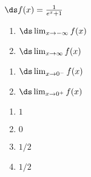 {$\ds f(x) = \frac{1}{e^x+1}$

\begin{minipage}[t]{.5\linewidth}
\begin{enumerate}
\item		$\ds \lim_{x\to -\infty} f(x)$
\item		$\ds \lim_{x\to \infty} f(x)$
\end{enumerate}
\end{minipage}
\begin{minipage}[t]{.5\linewidth}
\begin{enumerate}\addtocounter{enumii}{2}
\item		$\ds \lim_{x\to 0^-} f(x)$
\item		$\ds \lim_{x\to 0^+} f(x)$
\end{enumerate}
\end{minipage}

}
{\begin{enumerate}
\item	$1$
\item	$0$
\item	$1/2$
\item	$1/2$
\end{enumerate}
}
